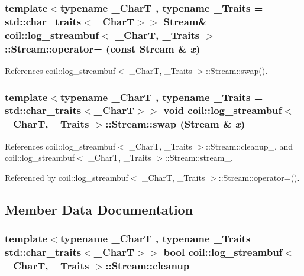 \subsubsection[{operator=}]{\setlength{\rightskip}{0pt plus 5cm}template$<$typename \_\-CharT , typename \_\-Traits  = std::char\_\-traits$<$\_\-CharT$>$$>$ {\bf Stream}\& {\bf coil::log\_\-streambuf}$<$ \_\-CharT, \_\-Traits $>$::Stream::operator= (const {\bf Stream} \& {\em x})\hspace{0.3cm}{\ttfamily  [inline]}}\label{structcoil_1_1log__streambuf_1_1Stream_a7fb53fc7cd206f99c8e251663e307323}


References coil::log\_\-streambuf$<$ \_\-CharT, \_\-Traits $>$::Stream::swap().

\subsubsection[{swap}]{\setlength{\rightskip}{0pt plus 5cm}template$<$typename \_\-CharT , typename \_\-Traits  = std::char\_\-traits$<$\_\-CharT$>$$>$ void {\bf coil::log\_\-streambuf}$<$ \_\-CharT, \_\-Traits $>$::Stream::swap ({\bf Stream} \& {\em x})\hspace{0.3cm}{\ttfamily  [inline]}}\label{structcoil_1_1log__streambuf_1_1Stream_a45057b9b7e72935f76194ffa72b395c2}


References coil::log\_\-streambuf$<$ \_\-CharT, \_\-Traits $>$::Stream::cleanup\_\-, and coil::log\_\-streambuf$<$ \_\-CharT, \_\-Traits $>$::Stream::stream\_\-.



Referenced by coil::log\_\-streambuf$<$ \_\-CharT, \_\-Traits $>$::Stream::operator=().



\subsection{Member Data Documentation}
\subsubsection[{cleanup\_\-}]{\setlength{\rightskip}{0pt plus 5cm}template$<$typename \_\-CharT , typename \_\-Traits  = std::char\_\-traits$<$\_\-CharT$>$$>$ bool {\bf coil::log\_\-streambuf}$<$ \_\-CharT, \_\-Traits $>$::{\bf Stream::cleanup\_\-}}\label{structcoil_1_1log__streambuf_1_1Stream_a673577f0750a576f536a5ad4572057a1}


